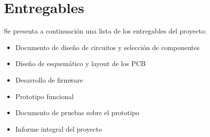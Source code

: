 \section{Entregables}

Se presenta a continuación una lista de los entregables del proyecto:

\begin{itemize}
    \item Documento de diseño de circuitos y selección de componentes
    \item Diseño de esquemático y layout de los PCB
    \item Desarrollo de firmware
    \item Prototipo funcional
    \item Documento de pruebas sobre el prototipo
    \item Informe integral del proyecto

    \end{itemize}